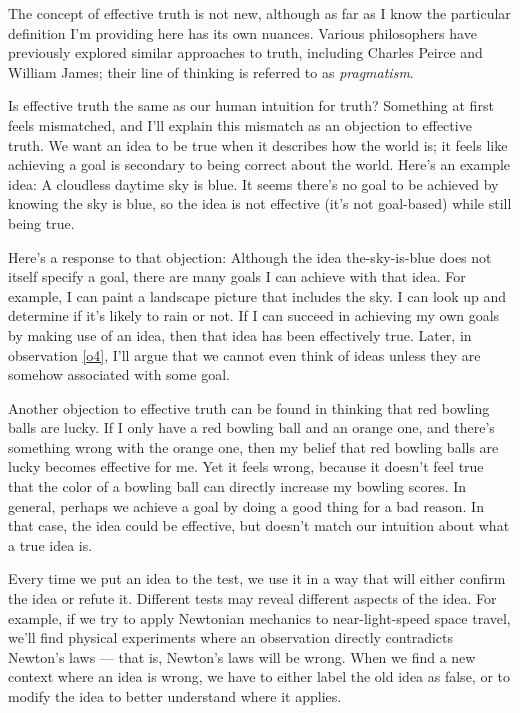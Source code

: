 \documentclass[9pt, twoside]{book}
\theoremstyle{argtstyle}
\begin{document}
The concept of effective truth is not new, although as far as I know the
particular definition I'm providing here has its own nuances.
Various philosophers have previously
explored similar approaches to truth, including Charles Peirce and William
James; their line of thinking is referred to as {\em pragmatism}.

Is effective truth the same as our human intuition for truth?
Something at first feels mismatched, and I'll explain this mismatch as an
objection to effective truth.
We want an idea to be true when it describes how the world is;
it feels like achieving a goal is secondary to being
correct about the world.
Here's an example idea: A cloudless daytime sky is blue.
It seems there's no goal to be achieved by knowing the sky is blue,
so the idea is not effective (it's not goal-based) while
still being true.

Here's a response to that objection:
Although the idea the-sky-is-blue does not itself specify a goal, there
are many goals I can achieve with that idea. For example, I can paint a
landscape picture that includes the sky.
I can look up and determine if it's likely to rain or not.
If I can succeed in achieving my own goals by making use of an
idea, then that idea has been effectively true.
Later, in observation \ref{o4}, I'll argue that we cannot
even think of ideas
unless they are somehow associated with some goal.

Another objection to effective truth can be found in thinking that red bowling
balls are lucky.
If I only have a red bowling ball and an orange one,
and there's
something wrong with the orange one, then my belief that red bowling balls are
lucky becomes effective for me.
Yet it feels wrong, because it doesn't feel true
that the color of a bowling ball can directly increase my bowling scores.
In general, perhaps we achieve a goal by doing a good thing for a bad reason.
In that case, the idea could be effective, but doesn't match our intuition about
what a true idea is.

Every time we put an idea to the test, we use it in a way that will either
confirm the idea or refute it. Different tests may reveal different aspects of
the idea. For example, if we try to apply Newtonian mechanics to
near-light-speed space travel, we'll find physical experiments where an
observation directly contradicts Newton's laws --- that is, Newton's laws will
be wrong.
When we find a new context where an idea is wrong, we have to either
label the old idea as false, or to modify the idea to
better understand where it applies.
\end{document}
